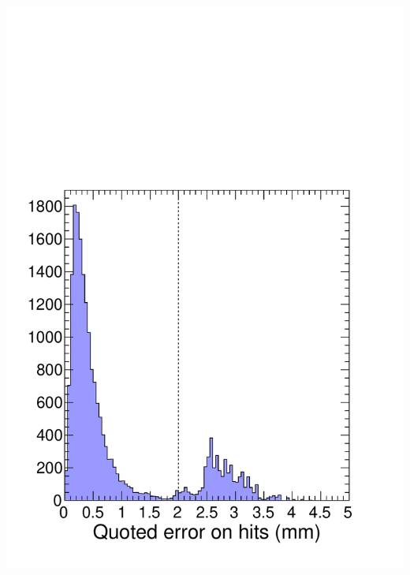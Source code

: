 \documentclass[compress]{beamer}
\begin{document}
\begin{frame}
\begin{columns}
\includegraphics[width=\linewidth]{tworuns_hiterror.pdf}


\end{columns}
\end{frame}
\end{document}
